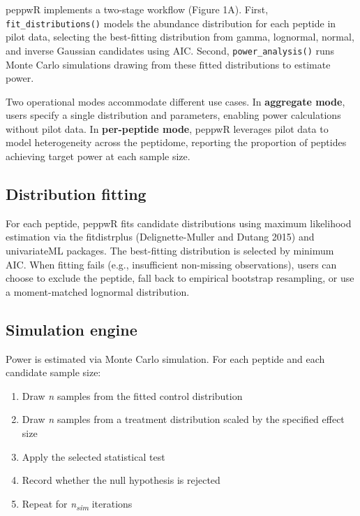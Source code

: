 \documentclass[
]{article}
\providecommand{\tightlist}{%
  \setlength{\itemsep}{0pt}\setlength{\parskip}{0pt}}
\begin{document}
peppwR implements a two-stage workflow (Figure 1A). First,
\texttt{fit\_distributions()} models the abundance distribution for each
peptide in pilot data, selecting the best-fitting distribution from
gamma, lognormal, normal, and inverse Gaussian candidates using AIC.
Second, \texttt{power\_analysis()} runs Monte Carlo simulations drawing
from these fitted distributions to estimate power.

Two operational modes accommodate different use cases. In
\textbf{aggregate mode}, users specify a single distribution and
parameters, enabling power calculations without pilot data. In
\textbf{per-peptide mode}, peppwR leverages pilot data to model
heterogeneity across the peptidome, reporting the proportion of peptides
achieving target power at each sample size.

\subsection{Distribution fitting}\label{distribution-fitting}

For each peptide, peppwR fits candidate distributions using maximum
likelihood estimation via the fitdistrplus (Delignette-Muller and Dutang
2015) and univariateML packages. The best-fitting distribution is
selected by minimum AIC. When fitting fails (e.g., insufficient
non-missing observations), users can choose to exclude the peptide, fall
back to empirical bootstrap resampling, or use a moment-matched
lognormal distribution.

\subsection{Simulation engine}\label{simulation-engine}

Power is estimated via Monte Carlo simulation. For each peptide and each
candidate sample size:

\begin{enumerate}
\def\labelenumi{\arabic{enumi}.}
\tightlist
\item
  Draw \emph{n} samples from the fitted control distribution
\item
  Draw \emph{n} samples from a treatment distribution scaled by the
  specified effect size
\item
  Apply the selected statistical test
\item
  Record whether the null hypothesis is rejected
\item
  Repeat for \emph{n\textsubscript{sim}} iterations
\end{enumerate}
\end{document}

